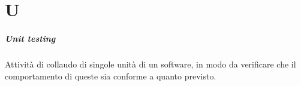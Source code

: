 \chapter{U}

\paragraph*{Unit testing}
Attività di collaudo di singole unità di un software, in modo da verificare che il comportamento di queste sia conforme a quanto previsto.